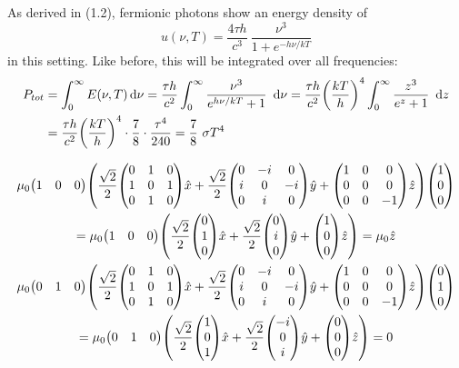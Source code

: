 \documentclass{theoblatt}
\begin{document}
As derived in (1.2), fermionic photons show an energy density of
\[ u(\nu, T) = \frac{4\tau h}{c^3}\ \frac{\nu^3}{1 + e^{-h\nu/kT}} \]
in this setting. Like before, this will be integrated over all frequencies:
\begin{align*}
    P_{tot} &= \int_0^\infty E(\nu, T)\dd\nu
    = \frac{\tau h}{c^2} \int_0^\infty \frac{\nu^3}{e^{h\nu/kT}+1}\ \dd\nu
    = \frac{\tau h}{c^2} \qty(\frac{kT}h)^4 \int_0^\infty \frac{z^3}{e^z+1}\ \dd z \\
    &= \frac{\tau h}{c^2} \qty(\frac{kT}h)^4 \cdot \frac78 \cdot \frac{\tau^4}{240}
    = \frac78\ \sigma T^4
\end{align*}

\task
\ttask
\begin{gather*}
    \mu_0 \mqty( 1 & 0 & 0 ) \qty(\frac{\sqrt2}2\mqty(0&1&0\\1&0&1\\0&1&0)\hat x+\frac{\sqrt2}2\mqty(0&-i&0\\i&0&-i\\0&i&0)\hat y+\mqty(1&0&0\\0&0&0\\0&0&-1)\hat z)\mqty(1\\0\\0) \\
    = \mu_0 \mqty( 1 &0&0) \qty(\frac{\sqrt2}2\mqty(0\\1\\0)\hat x +\frac{\sqrt2}2\mqty(0\\i\\0)\hat y + \mqty(1\\0\\0)\hat z) = \mu_0\hat z
    \\
    \mu_0 \mqty( 0 & 1 & 0 ) \qty(\frac{\sqrt2}2\mqty(0&1&0\\1&0&1\\0&1&0)\hat x+\frac{\sqrt2}2\mqty(0&-i&0\\i&0&-i\\0&i&0)\hat y+\mqty(1&0&0\\0&0&0\\0&0&-1)\hat z)\mqty(0\\1\\0) \\
    = \mu_0 \mqty( 0 &1&0) \qty(\frac{\sqrt2}2\mqty(1\\0\\1)\hat x +\frac{\sqrt2}2\mqty(-i\\0\\i)\hat y + \mqty(0\\0\\0)\hat z) = 0

\end{gather*}
\end{document}
